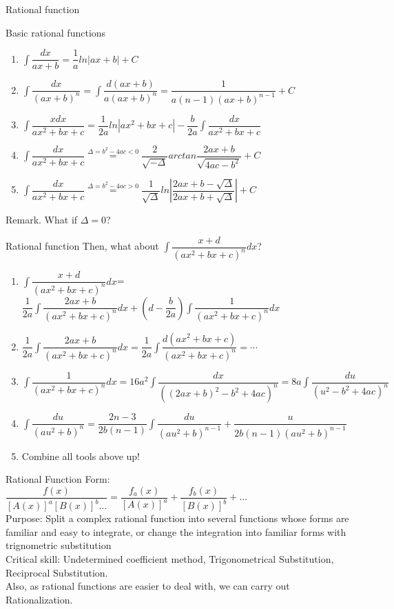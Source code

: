 \documentclass{beamer}
\begin{document}
\begin{frame}{Rational function}
    \begin{block}{Basic rational functions}
\begin{enumerate}
    \item $\int \dfrac{dx}{ax+b}=\dfrac{1}{a}ln|ax+b|+C$
    \item $\int \dfrac{dx}{(ax+b)^n}=\int\dfrac{d(ax+b)}{a(ax+b)^n}=\dfrac{1}{a(n-1)(ax+b)^{n-1}}+C$
    \item $\int \dfrac{xdx}{ax^2+bx+c}=\dfrac{1}{2a}ln|ax^2+bx+c|-\dfrac{b}{2a}\int\dfrac{dx}{ax^2+bx+c}$
    \item $\int \dfrac{dx}{ax^2+bx+c}\overset{\Delta=b^2-4ac<0}{=}\dfrac{2}{\sqrt{-\Delta}}arctan\dfrac{2ax+b}{\sqrt{4ac-b^2}}+C$
    \item $\int \dfrac{dx}{ax^2+bx+c}\overset{\Delta=b^2-4ac>0}{=}\dfrac{1}{\sqrt{\Delta}}ln|\dfrac{2ax+b-\sqrt{\Delta}}{2ax+b+\sqrt{\Delta}}|+C$
\end{enumerate}
\end{block}
Remark. What if $\Delta=0$?
\end{frame}
\begin{frame}{Rational function}
    Then, what about $\int \dfrac{x+d}{(ax^2+bx+c)^n}dx$?
    \small
    \begin{enumerate}
        \item $\int \dfrac{x+d}{(ax^2+bx+c)^n}dx$=$\dfrac{1}{2a}\int \dfrac{2ax+b}{(ax^2+bx+c)^n}dx+(d-\dfrac{b}{2a})\int\dfrac{1}{(ax^2+bx+c)^n}dx$
        \item $\dfrac{1}{2a}\int \dfrac{2ax+b}{(ax^2+bx+c)^n}dx=\dfrac{1}{2a}\int \dfrac{d(ax^2+bx+c)}{(ax^2+bx+c)^n}=\cdots$
        \item $\int\dfrac{1}{(ax^2+bx+c)^n}dx=16a^2\int\dfrac{dx}{((2ax+b)^2-b^2+4ac)^n}=8a\int\dfrac{du}{(u^2-b^2+4ac)^n}$
        \item $\int\dfrac{du}{(au^2+b)^n}=\dfrac{2n-3}{2b(n-1)}\int\dfrac{du}{(au^2+b)^{n-1}}+\dfrac{u}{2b(n-1)(au^2+b)^{n-1}}$
        \item Combine all tools above up!
    \end{enumerate}
    \normalsize
\end{frame}

\begin{frame}{Rational Function}
Form: $\dfrac{f(x)}{[A(x)]^{a}[B(x)]^{b}...}=\dfrac{f_{a}(x)}{[A(x)]^{a}}+\dfrac{f_{b}(x)}{[B(x)]^{b}}+...$\\
\bigskip
Purpose: Split a complex rational function into several functions whose forms are familiar and easy to integrate, or change the integration into familiar forms with trignometric substitution\\
\bigskip
Critical skill: \alert{Undetermined coefficient method, Trigonometrical Substitution, Reciprocal Substitution.}\\
Also, as rational functions are easier to deal with, we can carry out \alert{Rationalization.}
\bigskip
\end{frame}
\end{document}
